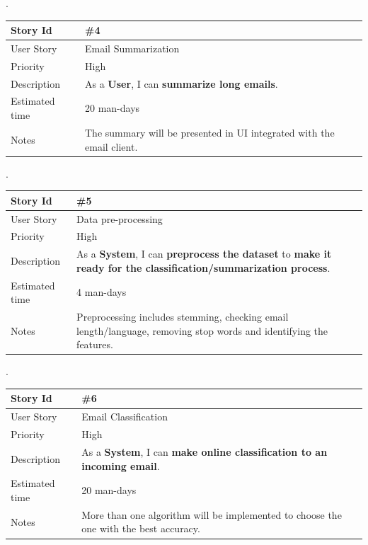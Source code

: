 \documentclass[a4paper,10pt]{article}
\begin{document}
.\\

\begin{tabular}{|p{3cm}|p{10cm}|}
\hline
\cellcolor[gray]{0.9} Story Id & \#4 \\ \hline
\cellcolor[gray]{0.9} User Story & Email Summarization\\ \hline
\cellcolor[gray]{0.9} Priority & High\\ \hline
\cellcolor[gray]{0.9} Description & 
	As a \textbf{User}, I can \textbf{summarize long emails}. \\ \hline
\cellcolor[gray]{0.9} Estimated time & 20 man-days\\ \hline
\cellcolor[gray]{0.9} Notes & 
	The summary will be presented in UI integrated with the email client. \\ \hline
\end{tabular}


.\\

\begin{tabular}{|p{3cm}|p{10cm}|}
\hline
\cellcolor[gray]{0.9} Story Id & \#5 \\ \hline
\cellcolor[gray]{0.9} User Story & Data pre-processing \\ \hline
\cellcolor[gray]{0.9} Priority & High\\ \hline
\cellcolor[gray]{0.9} Description & 
	As a \textbf{System}, I can \textbf{preprocess the dataset} to
	\textbf{make it ready for the classification/summarization process}. \\ \hline
\cellcolor[gray]{0.9} Estimated time & 4 man-days\\ \hline
\cellcolor[gray]{0.9} Notes & 
	Preprocessing includes stemming, checking email length/language,
	removing stop words and identifying the features. \\ \hline
\end{tabular}


.\\

\begin{tabular}{|p{3cm}|p{10cm}|}
\hline
\cellcolor[gray]{0.9} Story Id & \#6 \\ \hline
\cellcolor[gray]{0.9} User Story & Email Classification \\ \hline
\cellcolor[gray]{0.9} Priority & High\\ \hline
\cellcolor[gray]{0.9} Description & 
	As a \textbf{System}, I can \textbf{make online classification to
	an incoming email}. \\ \hline
\cellcolor[gray]{0.9} Estimated time & 20 man-days\\ \hline
\cellcolor[gray]{0.9} Notes & 
	More than one algorithm will be implemented to choose the one with 
	the best accuracy. \\ \hline
\end{tabular}
\end{document}
